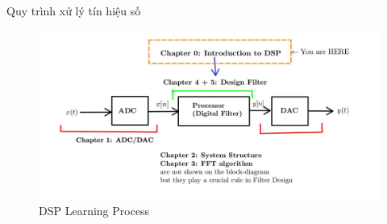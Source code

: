\documentclass[8pt]{beamer}
\begin{document}
\begin{frame}{Quy trình xử lý tín hiệu số}
\begin{figure}[h]
			\includegraphics[width=1.1\textwidth]{2.jpg}
			\caption{DSP Learning Process}			\label{fig:re2}
		\end{figure}


\end{frame}
\end{document}
